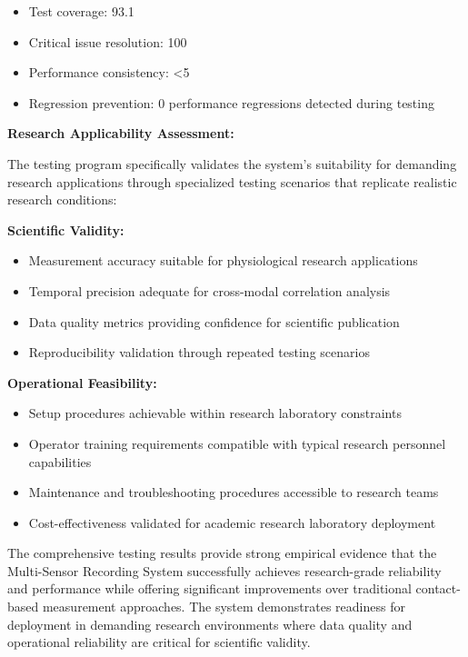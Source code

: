 \documentclass[12pt,a4paper]{report}
\begin{document}
\begin{itemize}
\item Test coverage: 93.1%
\item Critical issue resolution: 100%
\item Performance consistency: <5%
\item Regression prevention: 0 performance regressions detected during testing

\end{itemize}
\textbf{Research Applicability Assessment:}

The testing program specifically validates the system's suitability for demanding research applications through
specialized testing scenarios that replicate realistic research conditions:

\textbf{Scientific Validity:}

\begin{itemize}
\item Measurement accuracy suitable for physiological research applications
\item Temporal precision adequate for cross-modal correlation analysis
\item Data quality metrics providing confidence for scientific publication
\item Reproducibility validation through repeated testing scenarios

\end{itemize}
\textbf{Operational Feasibility:}

\begin{itemize}
\item Setup procedures achievable within research laboratory constraints
\item Operator training requirements compatible with typical research personnel capabilities
\item Maintenance and troubleshooting procedures accessible to research teams
\item Cost-effectiveness validated for academic research laboratory deployment

\end{itemize}
The comprehensive testing results provide strong empirical evidence that the Multi-Sensor Recording System successfully
achieves research-grade reliability and performance while offering significant improvements over traditional
contact-based measurement approaches. The system demonstrates readiness for deployment in demanding research
environments where data quality and operational reliability are critical for scientific validity.
\end{document}
